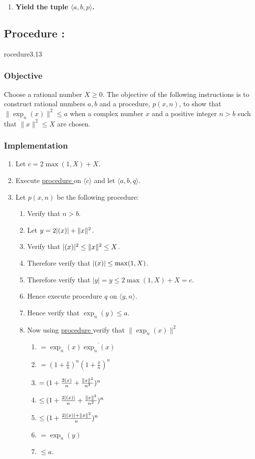 \documentclass{article}
\let\Re\relax\DeclareMathOperator{\Re}{re}
\newcommand{\conj}[1]{\overline{#1}}
\newcounter{procedure}[part]
\newcommand{\procedure}[1]{\subsection*{Procedure \thepart:\theprocedure}\label{sec:procedure #1}\global\expandafter\edef\csname procedure#1\endcsname{\thepart:\theprocedure}\addtocounter{procedure}{1}}
\newcommand{\objective}{\subsubsection*{Objective}}
\newcommand{\implementation}{\subsubsection*{Implementation}}
\newcommand{\procedurehr}[1]{\hyperref[sec:procedure #1]{procedure \expandafter\csname procedure#1\endcsname}}
\begin{document}
\begin{multicols}{2}
\begin{enumerate}
\begin{enumerate}
\begin{enumerate}
						\end{enumerate}
					\end{enumerate}
					\item \textbf{Yield the tuple $\langle a,b,p\rangle$.}
				\end{enumerate}
		\procedure{3.13}
			\objective
				Choose a rational number $X\ge 0$. The objective of the following instructions is to construct rational numbers $a,b$ and a procedure, $p(x,n)$, to show that $\lVert\exp_n(x)\rVert^2\le a$ when a complex number $x$ and a positive integer $n>b$ such that $\lVert x\rVert^2\le X$ are chosen.
			\implementation
				\begin{enumerate}
					\item Let $c=2\max(1,X)+X$.
					\item Execute \procedurehr{3.10} on $\langle c\rangle$ and let $\langle a,b,q\rangle$.
					\item Let $p(x,n)$ be the following procedure:
					\begin{enumerate}
						\item Verify that $n>b$.
						\item Let $y=2\lvert\Re(x)\rvert+\lVert x\rVert^2$.
						\item Verify that $\lvert\Re(x)\rvert^2\le\lVert x\rVert^2\le X$.
						\item Therefore verify that $\lvert\Re(x)\rvert\le\max(1,X)$.
						\item Therefore verify that $\lvert y\rvert=y\le 2\max(1,X)+X=c$.
						\item Hence execute procedure $q$ on $\langle y,n\rangle$.
						\item Hence verify that $\exp_n(y)\le a$.
						\item Now using \procedurehr{3.02} verify that $\lVert\exp_n(x)\rVert^2$
						\begin{enumerate}
							\item $=\exp_n(x)\conj{\exp_n(x)}$
							\item $=(1+\frac{x}{n})^n(1+\frac{\conj{x}}{n})^n$
							\item $=(1+\frac{2\Re(x)}{n}+\frac{\lVert x\rVert^2}{n^2})^n$
							\item $\le(1+\frac{2\lvert\Re(x)\rvert}{n}+\frac{\lVert x\rVert^2}{n^2})^n$
							\item $\le(1+\frac{2\lvert\Re(x)\rvert+\lVert x\rVert^2}{n})^n$
							\item $=\exp_n(y)$
							\item $\le a$.
						\end{enumerate}

\end{enumerate}
\end{enumerate}
\end{multicols}
\end{document}
